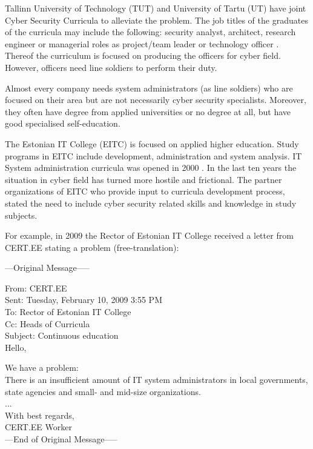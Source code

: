 Tallinn University of Technology (\gls{TUT}) and University of Tartu (\gls{UT}) have joint Cyber Security Curricula to alleviate the problem. The job titles of the graduates of the curricula may include the following: security analyst, architect, research engineer or managerial roles as project/team leader or technology officer \citep{TUT_UT_curriculum}. Thereof the curriculum is focused on producing the officers for cyber field. 
However, officers need line soldiers to perform their duty.

Almost every company needs system administrators (as line soldiers) who are focused on their area but are not necessarily cyber security specialists. Moreover, they often have degree from applied universities or no degree at all, but have good specialised self-education.

The Estonian IT College (\gls{EITC}) is focused on applied higher education. Study programs in \gls{EITC} include development, administration and system analysis. IT System administration curricula was opened in 2000 \citep{website:EITC_history}. In the last ten years the situation in cyber field has turned more hostile and frictional. The partner organizations of \gls{EITC} who provide input to curricula development process, stated the need to include cyber security related skills and knowledge in study subjects.

For example, in 2009 the Rector of Estonian IT College received a letter from \gls{CERT.EE} stating a problem (free-translation):\par

{
\begin{spacing}{1} 
\scriptsize
---Original Message-----

From: CERT.EE\\
Sent: Tuesday, February 10, 2009 3:55 PM\\
To: Rector of Estonian IT College\\
Cc: Heads of Curricula \\
Subject: Continuous education\\
Hello,

We have a problem:\\
There is an insufficient amount of IT system administrators in local governments, state agencies and small- and mid-size organizations.\\
...\\
With best regards,\\
CERT.EE Worker\\
---End of Original Message-----
\end{spacing}
}

